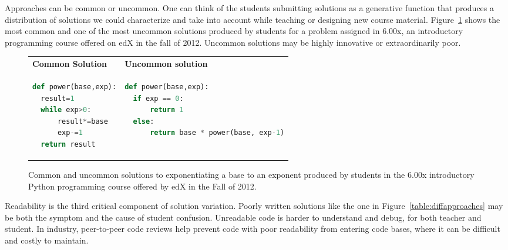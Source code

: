 Approaches can be common or uncommon. One can think of the students submitting solutions as a generative function that produces a distribution of solutions we could characterize and take into account while teaching or designing new course material. Figure~\ref{table:commonuncommon} shows the most common and one of the most uncommon solutions produced by students for a problem assigned in 6.00x, an introductory programming course offered on edX in the fall of 2012. Uncommon solutions may be highly innovative or extraordinarily poor.

\begin{figure}
\begin{tabular}{ll}
{\bf Common Solution} & {\bf Uncommon solution} \\
\begin{minipage}{0.5\linewidth}
\begin{lstlisting}[basicstyle=\linespread{1.0}\ttfamily\footnotesize,language=python]
def power(base,exp):
  result=1
  while exp>0:
      result*=base
      exp-=1
  return result
\end{lstlisting}
\end{minipage}
& 

\begin{minipage}{1.0\linewidth}
\begin{lstlisting}[basicstyle=\linespread{1.0}\ttfamily\footnotesize,language=python]
def power(base,exp):
  if exp == 0:
      return 1
  else:
      return base * power(base, exp-1)
\end{lstlisting}
\end{minipage} 
\end{tabular}
\caption{Common and uncommon solutions to exponentiating a base to an exponent produced by students in the 6.00x introductory Python programming course offered by edX in the Fall of 2012.}
\label{table:commonuncommon}
\end{figure}

Readability is the third critical component of solution variation. Poorly written solutions like the one in Figure~\ref{table:diffapproaches} may be both the symptom and the cause of student confusion. Unreadable code is harder to understand and debug, for both teacher and student. In industry, peer-to-peer code reviews help prevent code with poor readability from entering code bases, where it can be difficult and costly to maintain.

